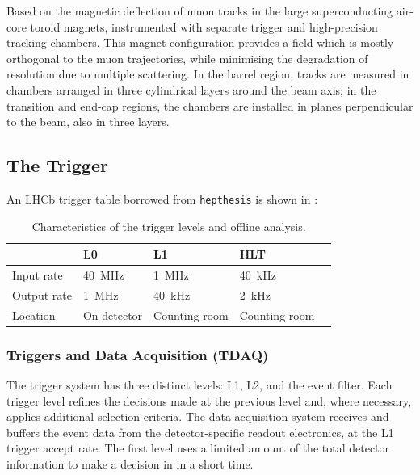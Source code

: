 Based on the magnetic deflection of muon tracks in the large superconducting air-core toroid magnets, instrumented with separate trigger and high-precision tracking chambers. This magnet configuration provides a field which is mostly orthogonal to the muon trajectories, while minimising the degradation of resolution due to multiple scattering. In the barrel region, tracks are measured in chambers arranged in three cylindrical layers around the beam axis; in the transition and end-cap regions, the chambers are installed in planes perpendicular to the beam, also in three layers.



\subsection{The Trigger}
\label{sec:bg-theory:triggers}
An LHCb trigger table borrowed from \texttt{hepthesis} is shown in :

\begin{table}[bht]
  \footnotesize\centering
  \setlength{\tabcolsep}{0.5em} %
  \caption{Characteristics of the trigger levels and offline analysis.}
  \begin{tabular}{lllll}
                & L0              & L1              & HLT             \\
    \midrule
    Input rate  & \SI{40}{\MHz} & \SI{1}{\MHz}  & \SI{40}{\kHz} \\
    Output rate & \SI{1}{\MHz}  & \SI{40}{\kHz} & \SI{2}{\kHz}  \\
    Location    & On detector     & Counting room   & Counting room   \\
  \end{tabular}
  \label{tab:bg-theory:trigger_details}
\end{table}


\subsubsection{Triggers and Data Acquisition (TDAQ)}

The trigger system has three distinct levels: L1, L2, and the event filter. Each trigger level refines the decisions made at the previous level and, where necessary, applies additional selection criteria. The data acquisition system receives and buffers the event data from the detector-specific readout electronics, at the L1 trigger accept rate. The first level uses a limited amount of the total detector information to make a decision in in a short time.


